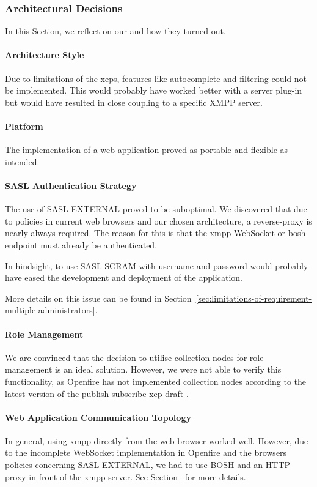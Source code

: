 \subsubsection{Architectural Decisions}
In this Section, we reflect on our  and how they turned out.

\paragraph{Architecture Style}
Due to limitations of the \glspl{xep}, features like autocomplete and filtering could not be implemented.
This would probably have worked better with a server plug-in but would have resulted in close coupling to a specific XMPP server.

\paragraph{Platform}
The implementation of a web application proved as portable and flexible as intended.

\paragraph{SASL Authentication Strategy}
The use of SASL EXTERNAL proved to be suboptimal.
We discovered that due to policies in current web browsers and our chosen architecture, a reverse-proxy is nearly always required. The reason for this is that the \gls{xmpp} WebSocket or \gls{bosh} endpoint must already be authenticated.

In hindsight, to use SASL SCRAM with username and password would probably have eased the development and deployment of the application.

More details on this issue can be found in Section~\ref{sec:limitations-of-requirement-multiple-administrators}.

\paragraph{Role Management}
We are convinced that the decision to utilise collection nodes for role management is an ideal solution.
However, we were not able to verify this functionality, as Openfire has not implemented collection nodes according to the latest version of the \gls{publish-subscribe} \gls{xep} draft \cite{xep-0248}.

\paragraph{Web Application Communication Topology}
In general, using \gls{xmpp} directly from the web browser worked well.
However, due to the incomplete WebSocket implementation in Openfire and the browsers policies concerning SASL EXTERNAL, we had to use BOSH and an HTTP proxy in front of the \gls{xmpp} server.
See Section~ for more details.

